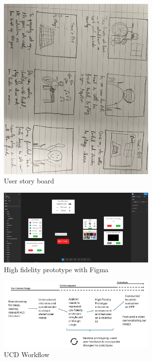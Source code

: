 \documentclass[12pt,a4paper]{article}
\begin{document}
\begin{figure}[H]  %
  \centering
  \includegraphics[width=0.7\textwidth]{story.jpg}  
  \caption{User story board}
  \label{fig:story_board}  
\end{figure}


\begin{figure}[H]  
  \centering
  \includegraphics[width=0.7\textwidth]{HFP.png}  
  \caption{High fidelity prototype with Figma}
  \label{fig:high_fidel_proto}  
\end{figure}

\begin{figure}[H]  
  \centering
  \includegraphics[width=0.7\textwidth]{workflow.png}  
  \caption{UCD Workflow}
  \label{fig:workflow}  
\end{figure}
\end{document}
